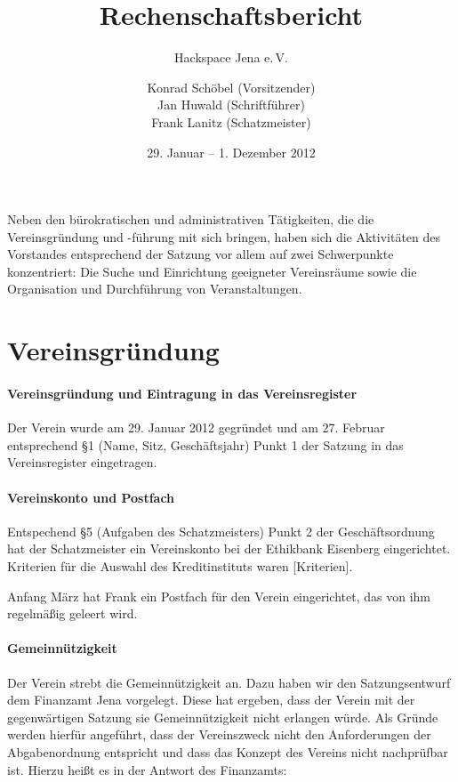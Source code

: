 \documentclass[10pt,DIV16]{scrartcl}
\title{Rechenschaftsbericht}
\subtitle{Hackspace Jena e.\,V.}
\author{%
	Konrad Schöbel (Vorsitzender)\\
	Jan Huwald (Schriftf\"uhrer)\\
	Frank Lanitz (Schatzmeister)
}
\date{29. Januar -- 1. Dezember 2012}
\begin{document}
\maketitle

\tableofcontents

Neben den bürokratischen und administrativen Tätigkeiten, die die
Vereinsgründung und -führung mit sich bringen, haben sich die Aktivitäten des
Vorstandes entsprechend der Satzung vor allem auf zwei Schwerpunkte
konzentriert:  Die Suche und Einrichtung geeigneter Vereinsräume sowie die
Organisation und Durchführung von Veranstaltungen.


\section{Vereinsgründung}

\paragraph{Vereinsgründung und Eintragung in das Vereinsregister}

Der Verein wurde am 29. Januar 2012 gegründet und am 27. Februar entsprechend
§1 (Name, Sitz, Geschäftsjahr) Punkt 1 der Satzung in das Vereinsregister
eingetragen.

\paragraph{Vereinskonto und Postfach}

Entspechend §5 (Aufgaben des Schatzmeisters) Punkt 2 der Geschäftsordnung hat
der Schatzmeister ein Vereinskonto bei der Ethikbank Eisenberg eingerichtet.
Kriterien für die Auswahl des Kreditinstituts waren [Kriterien].

Anfang März hat Frank ein Postfach für den Verein eingerichtet, das von ihm
regelmäßig geleert wird. 


\paragraph{Gemeinnützigkeit}

Der Verein strebt die Gemeinnützigkeit an.  Dazu haben wir den Satzungsentwurf
dem Finanzamt Jena vorgelegt.  Diese hat ergeben, dass der Verein mit der
gegenwärtigen Satzung sie Gemeinnützigkeit nicht erlangen würde.  Als Gründe
werden hierfür angeführt, dass der Vereinszweck nicht den Anforderungen der
Abgabenordnung entspricht und dass das Konzept des Vereins nicht nachprüfbar
ist.  Hierzu heißt es in der Antwort des Finanzamts:
\end{document}
